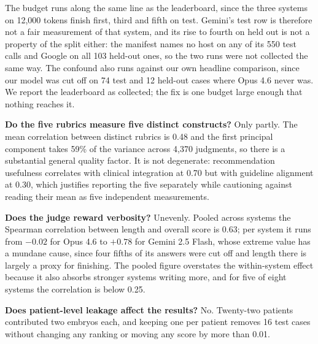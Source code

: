 \documentclass[11pt]{article}
\begin{document}
The budget runs along the same line as the leaderboard, since the three systems
on 12,000 tokens finish first, third and fifth on test. Gemini's test row is
therefore not a fair measurement of that system, and its rise to fourth on held
out is not a property of the split either: the manifest names no host on any of
its 550 test calls and Google on all 103 held-out ones, so the two runs were not
collected the same way. The confound also runs against our own headline
comparison, since our model was cut off on 74 test and 12 held-out cases where
Opus 4.6 never was. We report the leaderboard as collected; the fix is one budget
large enough that nothing reaches it.

\textbf{Do the five rubrics measure five distinct constructs?} Only partly. The
mean correlation between distinct rubrics is 0.48 and the first principal
component takes 59\% of the variance across 4,370 judgments, so there is a
substantial general quality factor. It is not degenerate: recommendation
usefulness correlates with clinical integration at 0.70 but with guideline
alignment at 0.30, which justifies reporting the five separately while cautioning
against reading their mean as five independent measurements.

\textbf{Does the judge reward verbosity?} Unevenly. Pooled across systems the
Spearman correlation between length and overall score is 0.63; per system it runs
from $-0.02$ for Opus 4.6 to $+0.78$ for Gemini 2.5 Flash, whose extreme value
has a mundane cause, since four fifths of its answers were cut off and length
there is largely a proxy for finishing. The pooled figure overstates the
within-system effect because it also absorbs stronger systems writing more, and
for five of eight systems the correlation is below 0.25.

\textbf{Does patient-level leakage affect the results?} No. Twenty-two patients
contributed two embryos each, and keeping one per patient removes 16 test cases
without changing any ranking or moving any score by more than 0.01.
\end{document}
